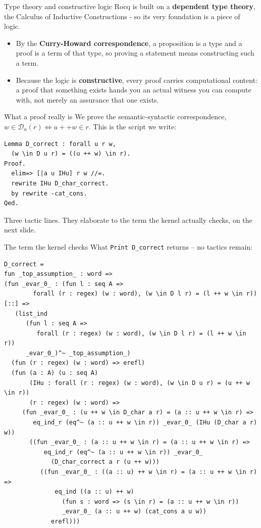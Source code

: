 \documentclass[aspectratio=169]{beamer}
\newcommand{\Dd}{\mathcal{D}}                 %
\begin{document}
\begin{frame}{Type theory and constructive logic}
  Rocq is built on a \textbf{dependent type theory}, the Calculus of Inductive
  Constructions - so its very foundation is a piece of logic.
  \vfill
  \begin{itemize}
    \item By the \textbf{Curry-Howard correspondence}, a proposition is a type
          and a proof is a term of that type, so proving a statement means
          constructing such a term.
    \item Because the logic is \textbf{constructive}, every proof carries
          computational content: a proof that something exists hands you an
          actual witness you can compute with, not merely an assurance that one
          exists.
  \end{itemize}
\end{frame}

\begin{frame}[fragile]{What a proof really is}
  We prove the semantic-syntactic correspondence,
  $w\in\Dd_u(r)\iff u{+}{+}w\in r$. This is the script we write:
  \vfill
  \begin{center}
\begin{lstlisting}[style=rocqstyle,basicstyle=\ttfamily\small]
Lemma D_correct : forall u r w,
  (w \in D u r) = ((u ++ w) \in r).
Proof.
  elim=> [|a u IHu] r w //=.
  rewrite IHu D_char_correct.
  by rewrite -cat_cons.
Qed.
\end{lstlisting}
  \end{center}
  \vfill
  Three tactic lines. They elaborate to the term the kernel actually checks,
  on the next slide.
\end{frame}

\begin{frame}[fragile]{The term the kernel checks}
  What \texttt{Print D\_correct} returns -- no tactics remain:
\begin{lstlisting}[style=rocqstyle,basicstyle=\ttfamily\tiny]
D_correct =
fun _top_assumption_ : word =>
(fun _evar_0_ : (fun l : seq A =>
        forall (r : regex) (w : word), (w \in D l r) = (l ++ w \in r)) [::] =>
   (list_ind
      (fun l : seq A =>
         forall (r : regex) (w : word), (w \in D l r) = (l ++ w \in r))
      _evar_0_)^~ _top_assumption_)
  (fun (r : regex) (w : word) => erefl)
  (fun (a : A) (u : seq A)
       (IHu : forall (r : regex) (w : word), (w \in D u r) = (u ++ w \in r))
       (r : regex) (w : word) =>
     (fun _evar_0_ : (u ++ w \in D_char a r) = (a :: u ++ w \in r) =>
        eq_ind_r (eq^~ (a :: u ++ w \in r)) _evar_0_ (IHu (D_char a r) w))
       ((fun _evar_0_ : (a :: u ++ w \in r) = (a :: u ++ w \in r) =>
           eq_ind_r (eq^~ (a :: u ++ w \in r)) _evar_0_
             (D_char_correct a r (u ++ w)))
          ((fun _evar_0_ : ((a :: u) ++ w \in r) = (a :: u ++ w \in r) =>
              eq_ind ((a :: u) ++ w)
                (fun s : word => (s \in r) = (a :: u ++ w \in r))
                _evar_0_ (a :: u ++ w) (cat_cons a u w))
             erefl)))
\end{lstlisting}
\end{frame}
\end{document}
